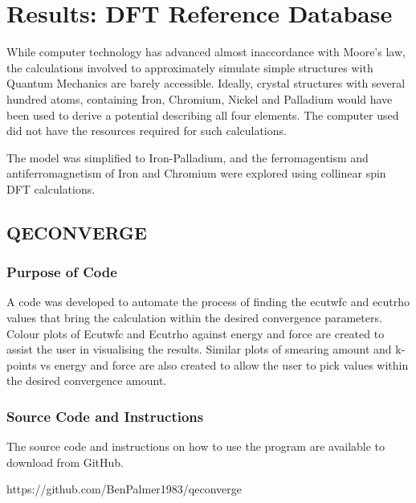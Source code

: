 \chapter{Results: DFT Reference Database}

\begin{changemargin}{1.0cm}{1.0cm}
\abstractpreamble{}
\end{changemargin}



While computer technology has advanced almost inaccordance with Moore's law, the calculations involved to approximately simulate simple structures with Quantum Mechanics are barely accessible.  Ideally, crystal structures with several hundred atoms, containing Iron, Chromium, Nickel and Palladium would have been used to derive a potential describing all four elements.  The computer used did not have the resources required for such calculations.

The model was simplified to Iron-Palladium, and the ferromagentism and antiferromagnetism of Iron and Chromium were explored using collinear spin DFT calculations.

\section{QECONVERGE}

\subsection{Purpose of Code}

A code was developed to automate the process of finding the ecutwfc and ecutrho values that bring the calculation within the desired convergence parameters.  Colour plots of Ecutwfc and Ecutrho against energy and force are created to assist the user in visualising the results.  Similar plots of smearing amount and k-points vs energy and force are also created to allow the user to pick values within the desired convergence amount.


\subsection{Source Code and Instructions}

The source code and instructions on how to use the program are available to download from GitHub.

https://github.com/BenPalmer1983/qeconverge




